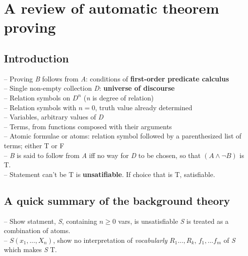 
\section{A review of automatic theorem proving}

\subsection{Introduction}
-- Proving \textit{B} follows from \textit{A}: conditions of \textbf{first-order predicate calculus}\\
-- Single non-empty collection \textit{D}: \textbf{universe of discourse}\\
-- Relation symbols on $D^{n}$ (\textit{n} is degree of relation)\\
-- Relation symbols with $n=0$, truth value already determined\\
-- Variables, arbitrary values of \textit{D}\\
-- Terms, from functions composed with their arguments\\
-- Atomic formulae or atoms: relation symbol followed by a parenthesized list of terms; either T or F\\
-- \textit{B} is said to follow from \textit{A} iff no way for \textit{D} to be chosen, so that $(A \land \lnot B)$ is T.\\
-- Statement can't be T is \textbf{unsatifiable}.  If choice that is T, satisfiable.\\

\subsection{A quick summary of the background theory}
-- Show statment, \textit{S}, containing $n \ge 0$ vars, is unsatisfiable \textit{S} is treated as a combination of atoms. \\
-- $S(x_1, ..., X_n)$, show no interpretation of \textit{vocabularly} $R_1 ..., R_k$, $f_1, ...f_m$ of \textit{S} which makes \textit{S} T.\\

